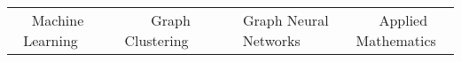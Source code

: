 

\begin{center}

\begin{tabular}{cccc}


 Machine Learning~~& ~~Graph Clustering~~ & ~~Graph Neural Networks~~ & ~~Applied Mathematics
\end{tabular}
\end{center}

